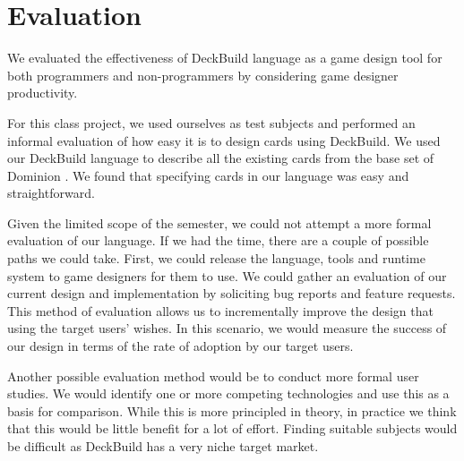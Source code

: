 
\section{Evaluation}
\label{sec:evaluation}

We evaluated the effectiveness of DeckBuild language as a game design tool for
both programmers and non-programmers by considering game designer productivity.

For this class project, we used ourselves as test subjects and performed an
informal evaluation of how easy it is to design cards using DeckBuild. We used
our DeckBuild language to describe all the existing cards from the base set of
Dominion \cite{DomCardList}. We found that specifying cards in our language was
easy and straightforward.

Given the limited scope of the semester, we could not attempt a more formal
evaluation of our language. If we had the time, there are a couple of possible
paths we could take. First, we could release the language, tools and runtime
system to game designers for them to use. We could gather an evaluation of our
current design and implementation by soliciting bug reports and feature
requests. This method of evaluation allows us to incrementally improve the
design that using the target users' wishes. In this scenario, we would measure
the success of our design in terms of the rate of adoption by our target users. 

Another possible evaluation method would be to conduct more formal user studies.
We would identify one or more competing technologies and use this as a basis for
comparison. While this is more principled in theory, in practice we think that
this would be little benefit for a lot of effort. Finding suitable subjects
would be difficult as DeckBuild has a very niche target market.
